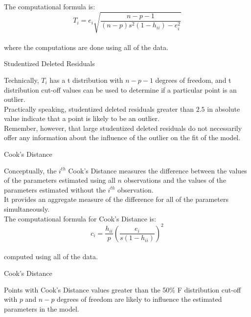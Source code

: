 {{\vspace{0.5in}
The computational formula is:
\vspace{0.15in}
\[ T_i = e_i\sqrt{\frac{n-p-1}{(n-p)s^2(1-h_{ii}) - e_i^2}} \] \\
\vspace{0.15in}
where the computations are done using all of the data.
\newpage
\begin{center}
Studentized Deleted Residuals
\end{center}
\vspace{0.5in}
Technically, $T_i$ has a t distribution with $n-p-1$ degrees of 
freedom, and t distribution cut-off values can be used to determine
if a particular point is an outlier. \\
\vspace{0.5in}
Practically speaking, 
studentized deleted residuals greater than $2.5$ in absolute value 
indicate that a point is likely to be an outlier. \\
\vspace{0.5in}
Remember, however, that large studentized deleted residuals do not 
necessarily offer any information about the influence
of the outlier on the fit of the model.
\newpage
\begin{center}
Cook's Distance 
\end{center}
\vspace{0.5in}
Conceptually, the $i^{th}$ Cook's Distance measures the difference
between the values of the parameters estimated using all $n$ observations
and the values of the parameters estimated without the $i^{th}$ observation. \\
\vspace{0.5in}
It provides an aggregate measure of the difference for all of the parameters
simultaneously. \\
\vspace{0.5in}
The computational formula for Cook's Distance is: 
\vspace{0.15in}
\[ c_i = \frac{h_{ii}}{p}(\frac{e_i}{s(1-h_{ii})})^2 \] \\
\vspace{0.15in}
computed using all of the data.
\newpage
\begin{center}
Cook's Distance 
\end{center}
\vspace{0.5in}
Points with Cook's Distance values greater than the 50\% F distribution cut-off
with $p$ and $n-p$ degrees of freedom are likely to influence the estimated
parameters in the model. \\
}}
